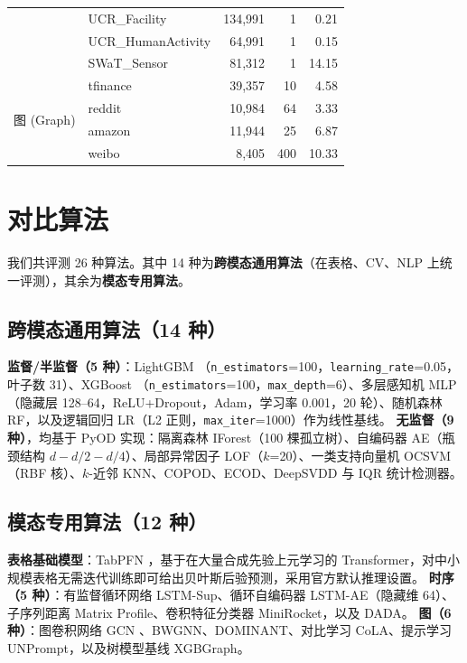 \begin{table}[!t]
\begin{tabular*}{\textwidth}{@{\extracolsep{\fill}}llrrr@{}}
      & UCR\_Facility      & 134{,}991 & 1 & 0.21 \\
      & UCR\_HumanActivity & 64{,}991  & 1 & 0.15 \\
      & SWaT\_Sensor       & 81{,}312  & 1 & 14.15 \\
    \midrule
    \multirow{4}{*}{图 (Graph)}
      & tfinance & 39{,}357 & 10  & 4.58 \\
      & reddit   & 10{,}984 & 64  & 3.33 \\
      & amazon   & 11{,}944 & 25  & 6.87 \\
      & weibo    & 8{,}405  & 400 & 10.33 \\
    \bottomrule
  \end{tabular*}
\end{table}

\section{对比算法}

我们共评测 26 种算法。其中 14 种为\textbf{跨模态通用算法}（在表格、CV、NLP 上统一评测），其余为\textbf{模态专用算法}。

\subsection{跨模态通用算法（14 种）}
\textbf{监督/半监督（5 种）}：LightGBM \cite{ke2017lightgbm}（\texttt{n\_estimators}=100，\texttt{learning\_rate}=0.05，叶子数 31）、XGBoost \cite{chen2016xgboost}（\texttt{n\_estimators}=100，\texttt{max\_depth}=6）、多层感知机 MLP（隐藏层 128--64，ReLU+Dropout，Adam，学习率 0.001，20 轮）、随机森林 RF，以及逻辑回归 LR（L2 正则，\texttt{max\_iter}=1000）作为线性基线。
\textbf{无监督（9 种）}，均基于 PyOD \cite{zhao2019pyod} 实现：隔离森林 IForest（100 棵孤立树）、自编码器 AE（瓶颈结构 $d\!-\!d/2\!-\!d/4$）、局部异常因子 LOF（$k$=20）、一类支持向量机 OCSVM（RBF 核）\cite{scholkopf1999support}、$k$-近邻 KNN、COPOD、ECOD、DeepSVDD 与 IQR 统计检测器。

\subsection{模态专用算法（12 种）}
\textbf{表格基础模型}：TabPFN \cite{hollmann2022tabpfn}，基于在大量合成先验上元学习的 Transformer，对中小规模表格无需迭代训练即可给出贝叶斯后验预测，采用官方默认推理设置。
\textbf{时序（5 种）}：有监督循环网络 LSTM-Sup、循环自编码器 LSTM-AE（隐藏维 64）、子序列距离 Matrix Profile、卷积特征分类器 MiniRocket，以及 DADA。
\textbf{图（6 种）}：图卷积网络 GCN \cite{gadbench2024}、BWGNN、DOMINANT、对比学习 CoLA、提示学习 UNPrompt，以及树模型基线 XGBGraph。

